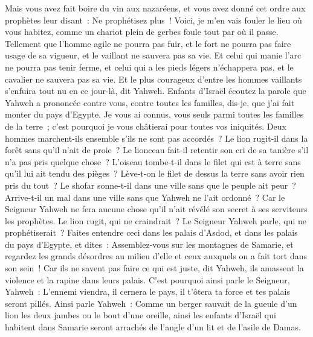 \begin{multicols}{2}
Mais vous avez fait boire du vin aux nazaréens, et vous avez donné cet ordre aux prophètes leur disant~: Ne prophétisez plus~!
Voici, je m'en vais fouler le lieu où vous habitez, comme un chariot plein de gerbes foule tout par où il passe.
Tellement que l'homme agile ne pourra pas fuir, et le fort ne pourra pas faire usage de sa vigueur, et le vaillant ne sauvera pas sa vie.
Et celui qui manie l'arc ne pourra pas tenir ferme, et celui qui a les pieds légers n'échappera pas, et le cavalier ne sauvera pas sa vie.
Et le plus courageux d'entre les hommes vaillants s'enfuira tout nu en ce jour-là, dit Yahweh.
\VerseOne{}Enfants d'Israël écoutez la parole que Yahweh a prononcée contre vous, contre toutes les familles, dis-je, que j'ai fait monter du pays d'Egypte.
Je vous ai connus, vous seuls parmi toutes les familles de la terre~; c'est pourquoi je vous châtierai pour toutes vos iniquités.
Deux hommes marchent-ils ensemble s'ils ne sont pas accordés~?
Le lion rugit-il dans la forêt sans qu'il n'ait de proie~? Le lionceau fait-il retentir son cri de sa tanière s'il n'a pas pris quelque chose~?
L'oiseau tombe-t-il dans le filet qui est à terre sans qu'il lui ait tendu des pièges~? Lève-t-on le filet de dessus la terre sans avoir rien pris du tout~?
Le shofar sonne-t-il dans une ville sans que le peuple ait peur~? Arrive-t-il un mal dans une ville sans que Yahweh ne l'ait ordonné~?
Car le Seigneur Yahweh ne fera aucune chose qu'il n'ait révélé son secret à ses serviteurs les prophètes. 
Le lion rugit, qui ne craindrait~? Le Seigneur Yahweh parle, qui ne prophétiserait~?
Faites entendre ceci dans les palais d'Asdod, et dans les palais du pays d'Egypte, et dites~: Assemblez-vous sur les montagnes de Samarie, et regardez les grands désordres au milieu d'elle et ceux auxquels on a fait tort dans son sein~!
Car ils ne savent pas faire ce qui est juste, dit Yahweh, ils amassent la violence et la rapine dans leurs palais.
C'est pourquoi ainsi parle le Seigneur, Yahweh~: L'ennemi viendra, il cernera le pays, il t'ôtera ta force et tes palais seront pillés.
Ainsi parle Yahweh~: Comme un berger sauvait de la gueule d'un lion les deux jambes ou le bout d'une oreille, ainsi les enfants d'Israël qui habitent dans Samarie seront arrachés de l'angle d'un lit et de l'asile de Damas.

\end{multicols}
